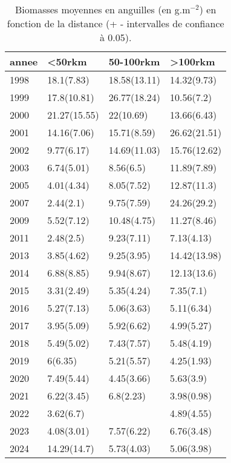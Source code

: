 \begin{table}[htbp]
\centering
\caption[Biomasse et distance.]{Biomasses moyennes en anguilles (en g.m$^{-2}$) en fonction de la distance (+ - intervalles de confiance à 0.05).} 
\label{table_biom_dist_annee}
\begin{tabular}{llll}
  \hline
annee & <50rkm & 50-100rkm & >100rkm \\ 
  \hline
1998 & 18.1(7.83) & 18.58(13.11) & 14.32(9.73) \\ 
  1999 & 17.8(10.81) & 26.77(18.24) & 10.56(7.2) \\ 
  2000 & 21.27(15.55) & 22(10.69) & 13.66(6.43) \\ 
  2001 & 14.16(7.06) & 15.71(8.59) & 26.62(21.51) \\ 
  2002 & 9.77(6.17) & 14.69(11.03) & 15.76(12.62) \\ 
  2003 & 6.74(5.01) & 8.56(6.5) & 11.89(7.89) \\ 
  2005 & 4.01(4.34) & 8.05(7.52) & 12.87(11.3) \\ 
  2007 & 2.44(2.1) & 9.75(7.59) & 24.26(29.2) \\ 
  2009 & 5.52(7.12) & 10.48(4.75) & 11.27(8.46) \\ 
  2011 & 2.48(2.5) & 9.23(7.11) & 7.13(4.13) \\ 
  2013 & 3.85(4.62) & 9.25(3.95) & 14.42(13.98) \\ 
  2014 & 6.88(8.85) & 9.94(8.67) & 12.13(13.6) \\ 
  2015 & 3.31(2.49) & 5.35(4.24) & 7.35(7.1) \\ 
  2016 & 5.27(7.13) & 5.06(3.63) & 5.11(6.34) \\ 
  2017 & 3.95(5.09) & 5.92(6.62) & 4.99(5.27) \\ 
  2018 & 5.49(5.02) & 7.43(7.57) & 5.48(4.19) \\ 
  2019 & 6(6.35) & 5.21(5.57) & 4.25(1.93) \\ 
  2020 & 7.49(5.44) & 4.45(3.66) & 5.63(3.9) \\ 
  2021 & 6.22(3.45) & 6.8(2.23) & 3.98(0.98) \\ 
  2022 & 3.62(6.7) &  & 4.89(4.55) \\ 
  2023 & 4.08(3.01) & 7.57(6.22) & 6.76(3.48) \\ 
  2024 & 14.29(14.7) & 5.73(4.03) & 5.06(3.98) \\ 
   \hline
\end{tabular}
\end{table}
